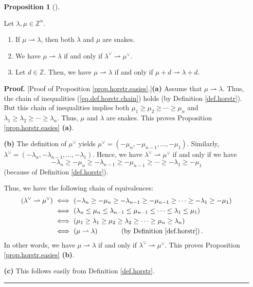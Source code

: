 \documentclass[numbers=enddot,12pt,final,onecolumn,notitlepage]{scrartcl}%
\theoremstyle{definition}
\newtheorem{prop}[theo]{Proposition}
\newenvironment{proposition}[1][]
{\begin{prop}[#1]\begin{leftbar}}
{\end{leftbar}\end{prop}}
\newenvironment{proof}[1][Proof]{\noindent\textbf{#1.} }{\ \rule{0.5em}{0.5em}}
\begin{document}
\begin{proposition}
\label{prop.horstr.easies}Let $\lambda,\mu\in\mathbb{Z}^{n}$.

\begin{enumerate}
\item[\textbf{(a)}] If $\mu\rightharpoonup\lambda$, then both $\lambda$ and
$\mu$ are snakes.

\item[\textbf{(b)}] We have $\mu\rightharpoonup\lambda$ if and only if
$\lambda^{\vee}\rightharpoonup\mu^{\vee}$.

\item[\textbf{(c)}] Let $d\in\mathbb{Z}$. Then, we have $\mu\rightharpoonup
\lambda$ if and only if $\mu+d\rightharpoonup\lambda+d$.
\end{enumerate}
\end{proposition}

\begin{proof}
[Proof of Proposition \ref{prop.horstr.easies}.]\textbf{(a)} Assume that
$\mu\rightharpoonup\lambda$. Thus, the chain of inequalities
(\ref{eq.def.horstr.chain}) holds (by Definition \ref{def.horstr}). But this
chain of inequalities implies both $\mu_{1}\geq\mu_{2}\geq\cdots\geq\mu_{n}$
and $\lambda_{1}\geq\lambda_{2}\geq\cdots\geq\lambda_{n}$. Thus, $\mu$ and
$\lambda$ are snakes. This proves Proposition \ref{prop.horstr.easies}
\textbf{(a)}.

\textbf{(b)} The definition of $\mu^{\vee}$ yields $\mu^{\vee}=\left(
-\mu_{n},-\mu_{n-1},\ldots,-\mu_{1}\right)  $. Similarly, $\lambda^{\vee
}=\left(  -\lambda_{n},-\lambda_{n-1},\ldots,-\lambda_{1}\right)  $. Hence, we
have $\lambda^{\vee}\rightharpoonup\mu^{\vee}$ if and only if we have%
\[
-\lambda_{n}\geq-\mu_{n}\geq-\lambda_{n-1}\geq-\mu_{n-1}\geq\cdots\geq
-\lambda_{1}\geq-\mu_{1}%
\]
(because of Definition \ref{def.horstr}).

Thus, we have the following chain of equivalences:%
\begin{align*}
\left(  \lambda^{\vee}\rightharpoonup\mu^{\vee}\right)  \  &
\Longleftrightarrow\ \left(  -\lambda_{n}\geq-\mu_{n}\geq-\lambda_{n-1}%
\geq-\mu_{n-1}\geq\cdots\geq-\lambda_{1}\geq-\mu_{1}\right) \\
&  \Longleftrightarrow\ \left(  \lambda_{n}\leq\mu_{n}\leq\lambda_{n-1}\leq
\mu_{n-1}\leq\cdots\leq\lambda_{1}\leq\mu_{1}\right) \\
&  \Longleftrightarrow\ \left(  \mu_{1}\geq\lambda_{1}\geq\mu_{2}\geq
\lambda_{2}\geq\cdots\geq\mu_{n}\geq\lambda_{n}\right) \\
&  \Longleftrightarrow\ \left(  \mu\rightharpoonup\lambda\right)
\ \ \ \ \ \ \ \ \ \ \left(  \text{by Definition \ref{def.horstr}}\right)  .
\end{align*}
In other words, we have $\mu\rightharpoonup\lambda$ if and only if
$\lambda^{\vee}\rightharpoonup\mu^{\vee}$. This proves Proposition
\ref{prop.horstr.easies} \textbf{(b)}.

\textbf{(c)} This follows easily from Definition \ref{def.horstr}.
\end{proof}
\end{document}
